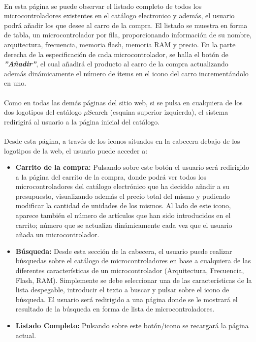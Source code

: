 \paragraph{}En esta página se puede observar el listado completo de todos los microcontroladores existentes en el catálogo electronico y además, el usuario podrá añadir los que desee al carro de la compra. El listado se muestra en forma de tabla, un microcontrolador por fila, proporcionando información de su nombre, arquitectura, frecuencia, memoria flash, memoria RAM y precio. En la parte derecha de la especificación de cada microcontrolador, se halla el botón de \textbf{\textit{''Añadir''}}, el cual añadirá el producto al carro de la compra actualizando además dinámicamente el número de ítems en el icono del carro incrementándolo en uno.

\paragraph{}Como en todas las demás páginas del sitio web, si se pulsa en cualquiera de los dos logotipos del catálogo $\mu$Search (esquina superior izquierda), el sistema redirigirá al usuario a la página inicial del catálogo.

\paragraph{}Desde esta página, a través de los iconos situados en la cabecera debajo de los logotipos de la web, el usuario puede acceder a:

\begin{itemize}
	\item \textbf{Carrito de la compra:} Pulsando sobre este botón el usuario será redirigido a la página del carrito de la compra, donde podrá ver todos los microcontroladores del catálogo electrónico que ha deciddo añadir a su presupuesto, visualizando además el precio total del mismo y pudiendo modificar la cantidad de unidades de los mismos.
	Al lado de este icono, aparece también el número de artículos que han sido introducidos en el carrito; número que se actualiza dinámicamente cada vez que el usuario añada un microcontrolador.
	
	\item \textbf{Búsqueda:} Desde esta sección de la cabecera, el usuario puede realizar búsquedas sobre el catálogo de microcontroladores en base a cualquiera de las diferentes características de un microcontrolador (Arquitectura, Frecuencia, Flash, RAM). Simplemente se debe seleccionar una de las características de la lista despegable, introducir el texto a buscar y pulsar sobre el icono de búsqueda.
	El usuario será redirigido a una página donde se le mostrará el resultado de la búsqueda en forma de lista de microcontroladores.
		
	\item \textbf{Listado Completo:} Pulsando sobre este botón/icono se recargará la página actual.
\end{itemize}
